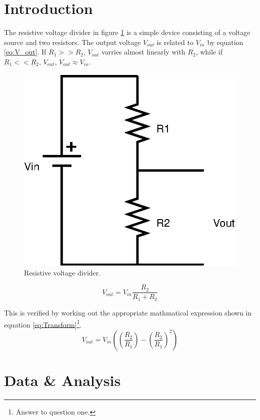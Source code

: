 \documentclass[11pt,onecolumn]{article}
\begin{document}
\section{Introduction}\label{sec:Introduction}
The resistive voltage divider in figure \ref{fig:Resistive_VD} is a simple device consisting of a voltage source and two resistors. The output voltage $V_{out}$ is related to $V_{in}$ by equation \ref{eq:V_out}. If $R_1 >> R_2$, $V_{out}$ varries almost linearly with $R_2$, while if $R_1 << R_2$, $V_{out}$, $V_{out} \approx V_{in}$.
\begin{figure}
\begin{center}
\includegraphics{Diagram1.eps}
\end{center}
%
\caption{Resistive voltage divider.}\label{fig:Resistive_VD}
\end{figure}
\begin{equation}\label{eq:V_out}
V_{out} = V_{in} \frac{R_2}{R_1 + R_2}
\end{equation}

This is verified by working out the appropriate mathmatical expression shown in equation \ref{eq:Transform}\footnote{Answer to question one.}.
\begin{equation}\label{eq:Transform}
V_{out} = V_{in} \left(\left(\frac{R_2}{R_1}\right) - \left(\frac{R_2}{R_1}\right)^2\right)
\end{equation}

\section{Data \& Analysis}\label{sec:DataAnalysis}
\end{document}
